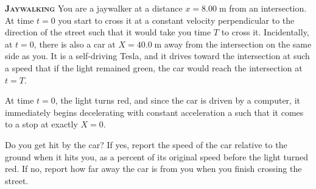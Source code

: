 \begin{problem}

\textbf{\textsc{Jaywalking}} You are a jaywalker at a distance $x=8.00\;\mathrm{m}$ from an intersection. At time $t = 0$ you start to cross it at a constant velocity perpendicular to the direction of the street such that it would take you time $T$ to cross it. Incidentally, at $t = 0$, there is also a car at $X = 40.0\;\mathrm{m}$ away from the intersection on the same side as you. It is a self-driving Tesla, and it drives toward the intersection at such a speed that if the light remained green, the car would reach the intersection at $t = T$.

At time $t = 0$, the light turns red, and since the car is driven by a computer, it immediately begins decelerating with constant acceleration a such that it comes to a stop at exactly $X = 0$.

Do you get hit by the car? If yes, report the speed of the car relative to the ground when it hits you, as a percent of its original speed before the light turned red. If no, report how far away the car is from you when you finish crossing the street.

\end{problem}